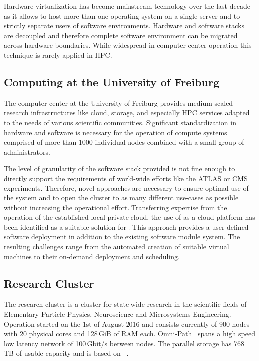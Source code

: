 Hardware virtualization has become mainstream technology over the last decade as it allows
to host more than one operating system on a single server and to strictly
separate users of software environments.
Hardware and software stacks are decoupled and therefore complete software
environment can be migrated across hardware boundaries.
While widespread in computer center
operation this technique is rarely applied in HPC.

\subsection{Computing at the University of Freiburg}

The computer center at the University of Freiburg provides
medium scaled research
infrastructures like cloud, storage, and especially HPC services adapted to the
needs of various scientific communities. Significant standardization
in hardware and software is necessary for the operation of compute systems comprised of
more than 1000 individual nodes combined with a small group of administrators.

The level of granularity of the software stack provided is not fine enough to
directly support the requirements of world-wide efforts like the
ATLAS or CMS experiments.
Therefore, novel approaches are necessary to ensure optimal use of the system and to open the cluster to as many different use-cases as
possible without increasing the operational effort.
Transferring expertise from the operation of the established local
private cloud, %
the use of \Openstack as a cloud platform has been identified
as a
suitable solution for \NEMO. This approach provides a user defined software
deployment in addition to the existing software module system.
The resulting challenges range from the automated creation of suitable
virtual machines to their on-demand deployment and scheduling.

\subsection{Research Cluster \NEMO}

The research cluster \NEMO is a cluster for state-wide
research in the scientific fields of Elementary Particle Physics, Neuroscience and
Microsystems Engineering. Operation started on the 1st of August 2016
and consists currently of 900 nodes with 20 physical cores and 128\,GiB of RAM each.
Omni-Path~\cite{Omnipath} spans a high speed low latency network of 100\,Gbit/s between nodes.
The parallel storage has
768\,TB of usable capacity and is based on \BeeGFS~\cite{BeeGFS}.

